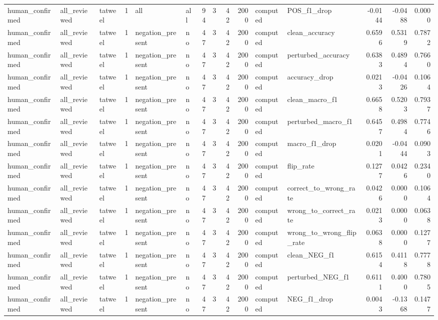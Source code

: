 \begin{tabular}{lllrllrrrrllrrr}
human_confirmed & all_reviewed & tatweel & 1 & all & all & 94 & 3 & 42 & 2000 & computed & POS_f1_drop & -0.0144 & -0.0488 & 0.0000 \\
human_confirmed & all_reviewed & tatweel & 1 & negation_present & no & 47 & 3 & 42 & 2000 & computed & clean_accuracy & 0.6596 & 0.5319 & 0.7872 \\
human_confirmed & all_reviewed & tatweel & 1 & negation_present & no & 47 & 3 & 42 & 2000 & computed & perturbed_accuracy & 0.6383 & 0.4894 & 0.7660 \\
human_confirmed & all_reviewed & tatweel & 1 & negation_present & no & 47 & 3 & 42 & 2000 & computed & accuracy_drop & 0.0213 & -0.0426 & 0.1064 \\
human_confirmed & all_reviewed & tatweel & 1 & negation_present & no & 47 & 3 & 42 & 2000 & computed & clean_macro_f1 & 0.6658 & 0.5203 & 0.7937 \\
human_confirmed & all_reviewed & tatweel & 1 & negation_present & no & 47 & 3 & 42 & 2000 & computed & perturbed_macro_f1 & 0.6457 & 0.4984 & 0.7746 \\
human_confirmed & all_reviewed & tatweel & 1 & negation_present & no & 47 & 3 & 42 & 2000 & computed & macro_f1_drop & 0.0201 & -0.0444 & 0.0903 \\
human_confirmed & all_reviewed & tatweel & 1 & negation_present & no & 47 & 3 & 42 & 2000 & computed & flip_rate & 0.1277 & 0.0426 & 0.2340 \\
human_confirmed & all_reviewed & tatweel & 1 & negation_present & no & 47 & 3 & 42 & 2000 & computed & correct_to_wrong_rate & 0.0426 & 0.0000 & 0.1064 \\
human_confirmed & all_reviewed & tatweel & 1 & negation_present & no & 47 & 3 & 42 & 2000 & computed & wrong_to_correct_rate & 0.0213 & 0.0000 & 0.0638 \\
human_confirmed & all_reviewed & tatweel & 1 & negation_present & no & 47 & 3 & 42 & 2000 & computed & wrong_to_wrong_flip_rate & 0.0638 & 0.0000 & 0.1277 \\
human_confirmed & all_reviewed & tatweel & 1 & negation_present & no & 47 & 3 & 42 & 2000 & computed & clean_NEG_f1 & 0.6154 & 0.4118 & 0.7778 \\
human_confirmed & all_reviewed & tatweel & 1 & negation_present & no & 47 & 3 & 42 & 2000 & computed & perturbed_NEG_f1 & 0.6111 & 0.4000 & 0.7805 \\
human_confirmed & all_reviewed & tatweel & 1 & negation_present & no & 47 & 3 & 42 & 2000 & computed & NEG_f1_drop & 0.0043 & -0.1368 & 0.1477 \\

\end{tabular}
